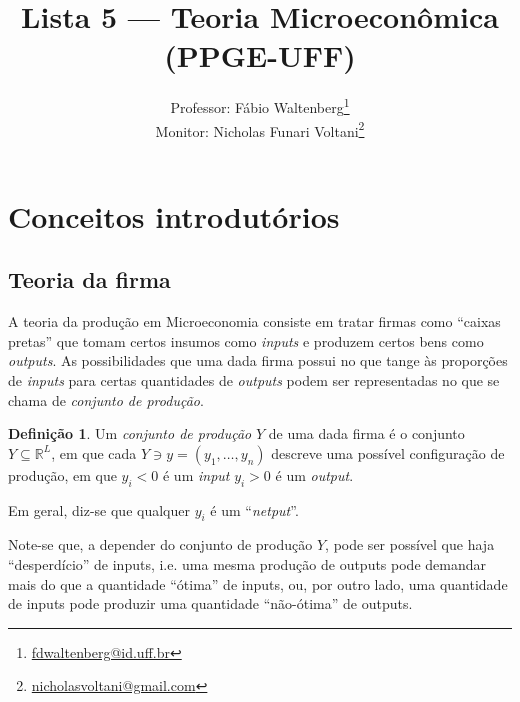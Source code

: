 \documentclass[12pt]{article}
\title{Lista 5 --- Teoria Microeconômica (PPGE-UFF)}
\author{Professor: Fábio Waltenberg\thanks{\href{mailto:fdwaltenberg@id.uff.br}{fdwaltenberg@id.uff.br}} \\Monitor: Nicholas Funari Voltani\thanks{\href{mailto:nicholasvoltani@gmail.com}{nicholasvoltani@gmail.com}}}
\date{}
\numberwithin{equation}{section}
\theoremstyle{plain}
\theoremstyle{definition}
\newtheorem{definition}[theorem]{Definição}
\theoremstyle{remark}
\begin{document}
\maketitle

\hypertarget{conceitos-introdutuxf3rios}{%
\section{Conceitos introdutórios}\label{conceitos-introdutuxf3rios}}

\hypertarget{teoria-da-firma}{%
\subsection{Teoria da firma}\label{teoria-da-firma}}

A teoria da produção em Microeconomia consiste em tratar firmas como ``caixas pretas'' que tomam certos insumos como \textit{inputs} e produzem certos bens como \textit{outputs}. As possibilidades que uma dada firma possui no que tange às proporções de \textit{inputs} para certas quantidades de \textit{outputs} podem ser representadas no que se chama de \textit{conjunto de produção}.

\begin{definition}
Um \textit{conjunto de produção} \(Y\) de uma dada firma é o conjunto
\(Y \subseteq \mathbb{R}^{L}\), em que cada
\(Y \ni y = (y_{1}, \dots, y_n)\) descreve uma possível configuração de
produção, em que \(y_{i}<0\) é um \textit{input} \(y_{i}>0\) é um
\textit{output}.

Em geral, diz-se que qualquer \(y_{i}\) é um ``\textit{netput}''.
\end{definition}

Note-se que, a depender do conjunto de produção \(Y\), pode ser possível que haja ``desperdício'' de inputs, i.e. uma mesma produção de outputs pode demandar mais do que a quantidade ``ótima'' de inputs, ou, por outro lado, uma quantidade de inputs pode produzir uma quantidade ``não-ótima'' de outputs.
\end{document}
